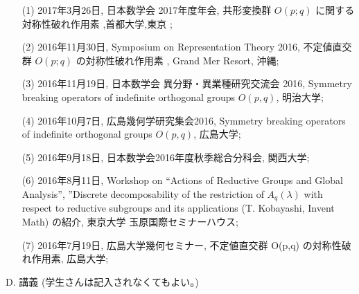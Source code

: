 \documentclass[a4j,twocolumn]{jarticle}
\begin{document}
\vspace{0.1cm}
\begin{enumerate}
	\item[(1)] 
2017年3月26日, 日本数学会 2017年度年会, 共形変換群 $O( p;q )$ に関する対称性破れ作用素 ,首都大学,東京 ;
	\item[(2)] 
2016年11月30日, Symposium on Representation Theory 2016, 不定値直交群 $O ( p; q )$ の対称性破れ作用素 , Grand Mer Resort, 沖縄;
	\item[(3)] 
2016年11月19日, 日本数学会 異分野・異業種研究交流会 2016, Symmetry breaking operators of indefinite orthogonal groups $O(p,q)$, 明治大学;
	\item[(4)] 
2016年10月7日, 広島幾何学研究集会2016, Symmetry breaking operators of indefinite orthogonal groups $O(p,q)$, 広島大学;
	\item[(5)] 
2016年9月18日, 日本数学会2016年度秋季総合分科会, 関西大学;
	\item[(6)] 
2016年8月11日, Workshop on “Actions of Reductive Groups and Global Analysis”, ”Discrete decomposability of the restriction of $A_q(\lambda)$ with respect to reductive subgroups and its applications (T. Kobayashi, Invent Math) の紹介, 東京大学 玉原国際セミナーハウス;
	\item[(7)] 
2016年7月19日, 広島大学幾何セミナー, 不定値直交群 O(p,q) の対称性破れ作用素, 広島大学;
\end{enumerate}

\vspace{0.2cm}
\noindent
D. 講義 (学生さんは記入されなくてもよい。)

\vspace{0.1cm}
\end{document}

